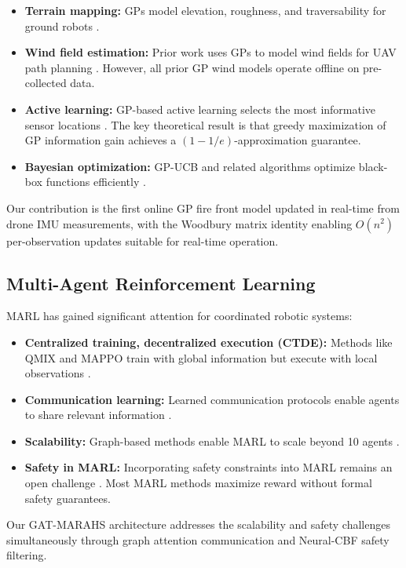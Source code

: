 \documentclass[12pt,a4paper]{article}
\begin{document}
\begin{itemize}[leftmargin=*]
    \item \textbf{Terrain mapping:} GPs model elevation, roughness, and traversability for ground robots \cite{Rasmussen2006}.
    \item \textbf{Wind field estimation:} Prior work uses GPs to model wind fields for UAV path planning \cite{Srinivas2010}. However, all prior GP wind models operate offline on pre-collected data.
    \item \textbf{Active learning:} GP-based active learning selects the most informative sensor locations \cite{Krause2008}. The key theoretical result is that greedy maximization of GP information gain achieves a $(1-1/e)$-approximation guarantee.
    \item \textbf{Bayesian optimization:} GP-UCB and related algorithms optimize black-box functions efficiently \cite{Srinivas2010}.
\end{itemize}

Our contribution is the first online GP fire front model updated in real-time from drone IMU measurements, with the Woodbury matrix identity enabling $O(n^2)$ per-observation updates suitable for real-time operation.

\subsection{Multi-Agent Reinforcement Learning}

MARL has gained significant attention for coordinated robotic systems:

\begin{itemize}[leftmargin=*]
    \item \textbf{Centralized training, decentralized execution (CTDE):} Methods like QMIX and MAPPO train with global information but execute with local observations \cite{PPO2017}.
    \item \textbf{Communication learning:} Learned communication protocols enable agents to share relevant information \cite{Rizk2019}.
    \item \textbf{Scalability:} Graph-based methods enable MARL to scale beyond 10 agents \cite{Rizk2019}.
    \item \textbf{Safety in MARL:} Incorporating safety constraints into MARL remains an open challenge \cite{Ames2014}. Most MARL methods maximize reward without formal safety guarantees.
\end{itemize}

Our GAT-MARAHS architecture addresses the scalability and safety challenges simultaneously through graph attention communication and Neural-CBF safety filtering.
\end{document}
